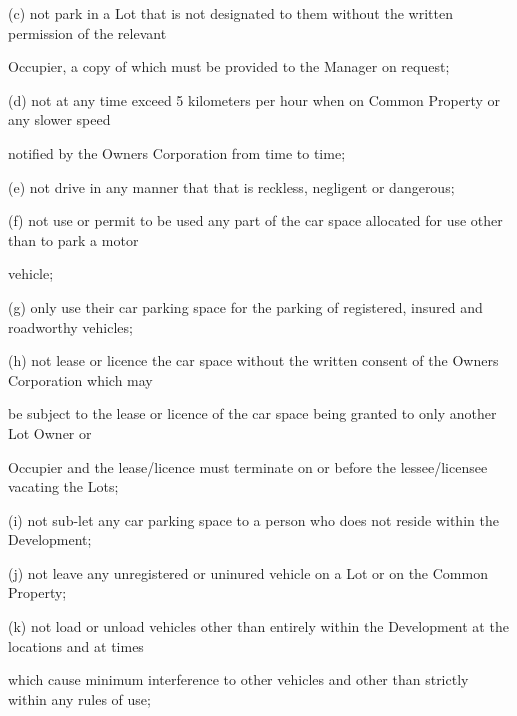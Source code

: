 \documentclass{article}
\begin{document}
{\fontsize{9.962}{1}(c) not park in a Lot that is not designated to them without the written permission of the relevant }

{\fontsize{10.02}{1}Occupier, a copy of which must be provided to the Manager on request; }

{\fontsize{9.962}{1}(d) not at any time exceed 5 kilometers per hour when on Common Property or any slower speed }

{\fontsize{10.02}{1}notified by the Owners Corporation from time to time; }

{\fontsize{9.962}{1}(e) not drive in any manner that that is reckless, negligent or dangerous; }

{\fontsize{9.962}{1}(f) not use or permit to be used any part of the car space allocated for use other than to park a motor }

{\fontsize{10.02}{1}vehicle; }

{\fontsize{9.962}{1}(g) only use their car parking space for the parking of registered, insured and roadworthy vehicles; }

{\fontsize{9.962}{1}(h) not lease or licence the car space without the written consent of the Owners Corporation which may }

{\fontsize{10.02}{1}be subject to the lease or licence of the car space being granted to only another Lot Owner or }

{\fontsize{10.02}{1}Occupier and the lease/licence must terminate on or before the lessee/licensee vacating the Lots; }

{\fontsize{9.962}{1}(i) not sub-let any car parking space to a person who does not reside within the Development; }

{\fontsize{9.962}{1}(j) not leave any unregistered or uninured vehicle on a Lot or on the Common Property; }

{\fontsize{9.962}{1}(k) not load or unload vehicles other than entirely within the Development at the locations and at times }

{\fontsize{10.02}{1}which cause minimum interference to other vehicles and other than strictly within any rules of use; }

\newpage
\end{document}
